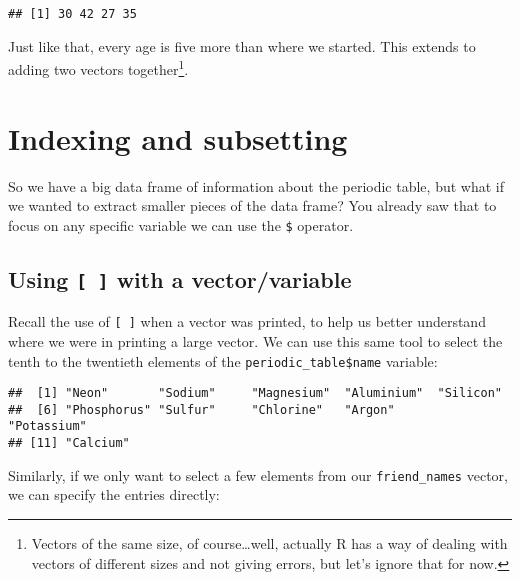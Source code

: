 \documentclass[]{tufte-book}
\newenvironment{Shaded}{\begin{snugshade}}{\end{snugshade}}
\newcommand{\DecValTok}[1]{\textcolor[rgb]{0.00,0.00,0.81}{#1}}
\newcommand{\NormalTok}[1]{#1}
\newcommand{\OperatorTok}[1]{\textcolor[rgb]{0.81,0.36,0.00}{\textbf{#1}}}
\begin{document}
\begin{verbatim}
## [1] 30 42 27 35
\end{verbatim}

Just like that, every age is five more than where we started. This extends to adding two vectors together\footnote{Vectors of the same size, of course\ldots{}well, actually R has a way of dealing with vectors of different sizes and not giving errors, but let's ignore that for now.}.

\hypertarget{index-sub}{%
\section{Indexing and subsetting}\label{index-sub}}

So we have a big data frame of information about the periodic table, but what if we wanted to extract smaller pieces of the data frame? You already saw that to focus on any specific variable we can use the \texttt{\$} operator.

\hypertarget{using-with-a-vectorvariable}{%
\subsection{\texorpdfstring{Using \texttt{{[}\ {]}} with a vector/variable}{Using {[} {]} with a vector/variable}}\label{using-with-a-vectorvariable}}

Recall the use of \texttt{{[}\ {]}} when a vector was printed, to help us better understand where we were in printing a large vector. We can use this same tool to select the tenth to the twentieth elements of the \texttt{periodic\_table\$name} variable:

\begin{Shaded}
\end{Shaded}

\begin{verbatim}
##  [1] "Neon"       "Sodium"     "Magnesium"  "Aluminium"  "Silicon"   
##  [6] "Phosphorus" "Sulfur"     "Chlorine"   "Argon"      "Potassium" 
## [11] "Calcium"
\end{verbatim}

Similarly, if we only want to select a few elements from our \texttt{friend\_names} vector, we can specify the entries directly:
\end{document}

